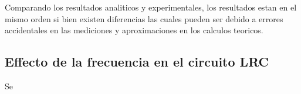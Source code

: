 Comparando los resultados analiticos y experimentales, los resultados estan en el mismo orden si bien existen diferencias las cuales pueden ser debido a errores accidentales en las mediciones y aproximaciones en los calculos teoricos. 

\subsection{Effecto de la frecuencia en el circuito LRC}
Se



